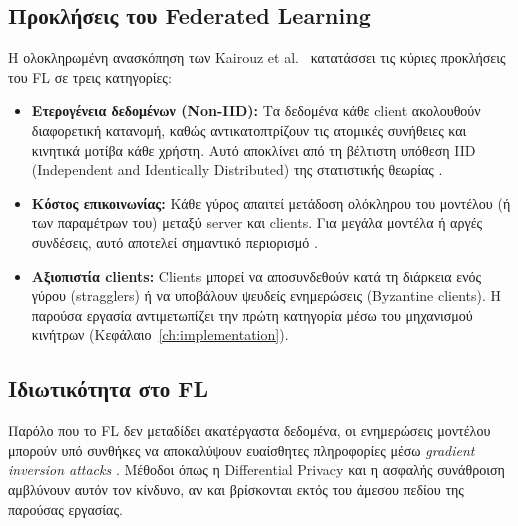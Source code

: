 \subsection{Προκλήσεις του Federated Learning}
\label{subsec:fl_challenges}

Η ολοκληρωμένη ανασκόπηση των Kairouz et al.\ \cite{Kairouz2021}
κατατάσσει τις κύριες προκλήσεις του FL σε τρεις κατηγορίες:

\begin{itemize}
    \item \textbf{Ετερογένεια δεδομένων (Non-IID):} Τα δεδομένα κάθε
    client ακολουθούν διαφορετική κατανομή, καθώς αντικατοπτρίζουν
    τις ατομικές συνήθειες και κινητικά μοτίβα κάθε χρήστη. Αυτό
    αποκλίνει από τη βέλτιστη υπόθεση IID (Independent and Identically
    Distributed) της στατιστικής θεωρίας \cite{Li2020}.

    \item \textbf{Κόστος επικοινωνίας:} Κάθε γύρος απαιτεί μετάδοση
    ολόκληρου του μοντέλου (ή των παραμέτρων του) μεταξύ server και
    clients. Για μεγάλα μοντέλα ή αργές συνδέσεις, αυτό αποτελεί
    σημαντικό περιορισμό \cite{Konecny2016}.

    \item \textbf{Αξιοπιστία clients:} Clients μπορεί να αποσυνδεθούν
    κατά τη διάρκεια ενός γύρου (stragglers) ή να υποβάλουν ψευδείς
    ενημερώσεις (Byzantine clients). Η παρούσα εργασία αντιμετωπίζει
    την πρώτη κατηγορία μέσω του μηχανισμού κινήτρων
    (Κεφάλαιο~\ref{ch:implementation}).
\end{itemize}

\subsection{Ιδιωτικότητα στο FL}
\label{subsec:fl_privacy}

Παρόλο που το FL δεν μεταδίδει ακατέργαστα δεδομένα, οι ενημερώσεις
μοντέλου μπορούν υπό συνθήκες να αποκαλύψουν ευαίσθητες πληροφορίες
μέσω \textit{gradient inversion attacks} \cite{Shokri2015}. Μέθοδοι
όπως η Differential Privacy \cite{Abadi2016} και η ασφαλής συνάθροιση
\cite{Bonawitz2017} αμβλύνουν αυτόν τον κίνδυνο, αν και βρίσκονται
εκτός του άμεσου πεδίου της παρούσας εργασίας.
